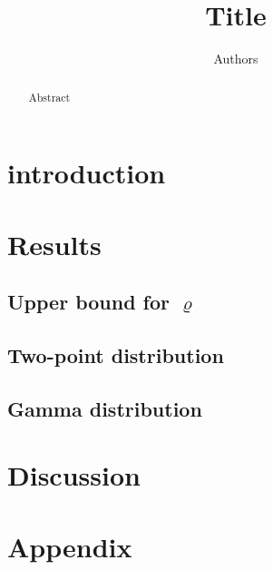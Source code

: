 \documentclass[paper=a4]{scrartcl}
\title{Title}
\author{Authors}
\date{}
\begin{document}
\maketitle 

\begin{abstract}
  Abstract
\end{abstract}

\section{introduction}

  

\section{Results}

  

  \subsection*{Upper bound for $\varrho$}

    

  \subsection*{Two-point distribution}  

    

  \subsection*{Gamma distribution}

    

\section{Discussion}

  
    
    \newpage
\clearpage     
\section{Appendix}

  




\printbibliography
  
  
\end{document}

